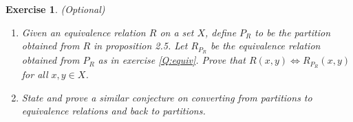 \documentclass{article}
\theoremstyle{plain}
\newtheorem{Q}{Exercise}{\bfseries}{\upshape}
\begin{document}
\begin{Q}(Optional)
\begin{enumerate}
\item[a)] Given an equivalence relation $R$ on a set $X$, define $P_R$ to be the partition obtained from $R$ in proposition 2.5. Let $R_{P_R}$ be the equivalence relation obtained from $P_R$ as in exercise \ref{Q:equiv}. Prove that $R(x,y)\iff R_{P_R}(x,y)$ for all $x,y\in X$. 
\item[b)] State and prove a similar conjecture on converting from partitions to equivalence relations and back to partitions.
\end{enumerate}
\end{Q}
\begin{comment}
\textbf{Solution:}
\begin{enumerate}[a)]
\item Suppose first that $R(x,y)$. Then $y\in[x]$, which is a way of saying that $y$ and $x$ are in the same part of the partition $P_R$. But this means $R_{P_R}(x,y)$. Conversely, if $R_{P_R}(x,y)$, then $y\in [x]$, which means $R(x,y)$. This shows $R = R_{P_R}$.
\item The sensible conjecture is that $P_{R_P} = P$. To prove this, let $P = \{X_i:i\in I\}$. We want to show that $\{X_i:i\in I\} = \{[x]_{R_P}: x\in X\}$. First, given any $x\in X$ we must have $x\in X_i$ for some $i$, as $P$ is a partition. We must prove that $[x]_{R_P} = X_i$. Now, 
\begin{align*}y\in [x]_{R_P} &\iff R_P(x,y) \\
&\iff y\in X_i. 
\end{align*}
This proves the claim because, because every $[x]_{R_P}$ is equal to $X_i$ where $x\in X_i$, and every $X_i$ is equal to $[x]_{R_P}$ for $x\in X_i$.  
\end{enumerate}
\end{comment}
\end{document}
